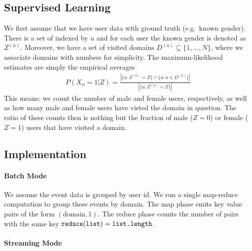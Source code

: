 \documentclass{article}
\begin{document}
\newpage

\subsection{Supervised Learning} We first assume that we have user data with ground truth (e.g.~known gender). There is a set of indexed by $u$ and for each user the known gender is denoted as $Z^{(u)}$. Moreover, we have a set of visited domains $D^{(u)} \subseteq \{ 1,\dots, N\}$, where we associate domains with numbers for simplicity. The maximum-likelihood estimates are simply the empirical averages
\begin{align}
P(X_n=1|Z) = \frac{ 
| \{ u: Z^{(u)} =Z \} 
  \cap 
\{ u: n \in D^{(u)} \} | 
}{
| \{ u: Z^{(u)} =Z \}|}
\end{align}
This means: we count the number of male and female users, respectively, as well as how many male and female users have visted the domain in question. The ratio of these counts then is nothing but the fraction of male ($Z=0$) or female ($Z=1$) users that have visited a domain. 

\subsection{Implementation}

\paragraph{Batch Mode} We assume the event data is grouped by user id. We  run a single map-reduce computation to group these events by domain. The map phase emits key value pairs of the form $(\text{domain}, 1)$. The reduce phase counts the number of pairs with the same key $\text{\tt reduce}(\text{\tt list}) = \text{\tt list.length}$.

\paragraph{Streaming Mode}







\end{document}
